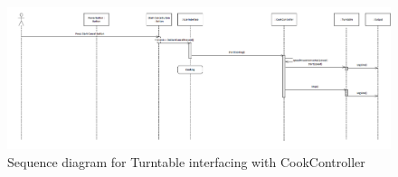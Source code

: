 \begin{figure}[h]
  \centering
  \includegraphics[scale=0.6]{02-Body/Image/TurntableSeq.PNG}
  \caption{Sequence diagram for Turntable interfacing with CookController}%
  \label{fig:TurntableSeq}
\end{figure}

\newpage
